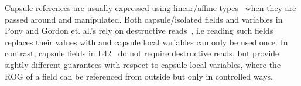 Capsule references are usually expressed using linear/affine types~\cite{boyland2001alias} when they are passed around and manipulated. Both capsule/isolated fields and variables in Pony and Gordon et. al.'s rely on destructive reads~\cite{GordonEtAl12,clebsch2015deny}, i.e reading such fields replaces their values with \Q@null@ and capsule local variables can only be used once. In contrast, capsule fields in L42~\cite{ServettoEtAl13a,ServettoZucca15} do not require destructive reads, but provide sightly different guarantees with respect to capsule local variables, where the ROG of a \Q@capsule@ field can be referenced from outside but only in controlled ways.




